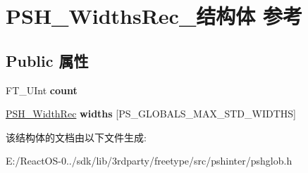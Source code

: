 \hypertarget{struct_p_s_h___widths_rec__}{}\section{P\+S\+H\+\_\+\+Widths\+Rec\+\_\+结构体 参考}
\label{struct_p_s_h___widths_rec__}
\subsection*{Public 属性}
\begin{DoxyCompactItemize}
\item 
\mbox{\label{struct_p_s_h___widths_rec___ae3ce08a15ef246455f859245017cda40}} 
F\+T\+\_\+\+U\+Int {\bfseries count}
\item 
\mbox{\label{struct_p_s_h___widths_rec___a52a91ea0edf500d918703dcfaf12aac1}} 
\hyperlink{struct_p_s_h___width_rec__}{P\+S\+H\+\_\+\+Width\+Rec} {\bfseries widths} \mbox{[}P\+S\+\_\+\+G\+L\+O\+B\+A\+L\+S\+\_\+\+M\+A\+X\+\_\+\+S\+T\+D\+\_\+\+W\+I\+D\+T\+HS\mbox{]}
\end{DoxyCompactItemize}


该结构体的文档由以下文件生成\+:\begin{DoxyCompactItemize}
\item 
E\+:/\+React\+O\+S-\/0../sdk/lib/3rdparty/freetype/src/pshinter/pshglob.\+h\end{DoxyCompactItemize}
